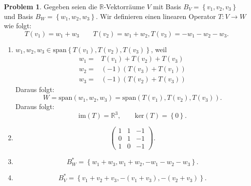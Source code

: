 \documentclass[prb,12pt]{revtex4-2}
\theoremstyle{definition}
\newtheorem{Problem}{Problem}
\theoremstyle{definition}
\newenvironment{parts}{\begin{enumerate}[label=(\alph*)]}{\end{enumerate}}
\newcommand{\R}{\mathbb{R}}
\begin{document}
\begin{Problem}
	Gegeben seien die $\R$-Vektorr\"{a}ume $V$ mit Basis $B_V=\left\{ v_1,v_2,v_3 \right\} $ und Basis $B_W=\left\{ w_1,w_2,w_3 \right\} $. Wir definieren einen linearen Operator $T: V \to W$ wie folgt:
	\[
	T(v_1)=w_1+w_3\qquad T(v_2)=w_1+w_2, T(v_3)=-w_1-w_2-w_3
	.\] 
	\begin{parts}
	\item $w_1,w_2,w_3\in \text{span}\left\{ T(v_1),T(v_2),T(v_3) \right\} $, weil
			\begin{align*}
				w_1=&T(v_1)+T(v_2)+T(v_3)\\
				w_2=&(-1)\left( T(v_3)+T(v_1) \right) \\
				w_3=&(-1)\left( T(v_2)+T(v_3) \right) 
			\end{align*}
			Daraus folgt:
			\[
				W=\text{span}\left( w_1,w_2,w_3 \right)=\text{span}\left( T(v_1), T(v_2), T(v_3) \right)  
			.\]
			Daraus folgt:
			\[
				\text{im}(T)=\R^3, \qquad \text{ker}(T)=\left\{ 0 \right\} 
			.\] 
		\item 
\[
	\begin{pmatrix} 1 & 1 & -1\\ 0 & 1 & -1\\1 & 0 & -1 \end{pmatrix} 
.\] 
\item \[
B_W^*=\left\{ w_1+w_3,w_1+w_2,-w_1-w_2-w_3 \right\} 
.\] 
\item \[
B_V^*=\left\{ v_1+v_2+v_3, -(v_1+v_3), -(v_2+v_3) \right\} 
.\] 
		\end{parts}
\end{Problem}
	
\end{document}
